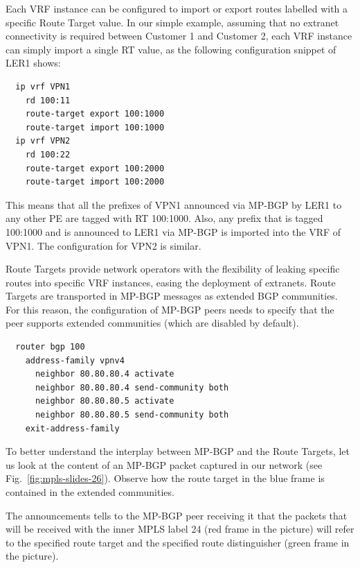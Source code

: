 \documentclass{article}
\newenvironment{codice}
{
\noindent
\begin{minipage}[b]{\columnwidth}
\definecolor{shadecolor}{rgb}{1,1,1}
\begin{framed}}
{
\vspace{-0.4cm}
\end{framed}
\end{minipage}
\definecolor{shadecolor}{rgb}{1,1,0.7}
}
\begin{document}
\begin{shaded}
\noindent
Each VRF instance can be configured to import or export routes labelled with a 
specific Route Target value. In our simple example, assuming that no extranet 
connectivity is required between Customer 1 and Customer 2, each VRF instance 
can simply import a single RT value, as the following configuration snippet of 
LER1 shows:

\begin{codice}
\begin{verbatim}
  ip vrf VPN1
    rd 100:11
    route-target export 100:1000
    route-target import 100:1000
  ip vrf VPN2
    rd 100:22
    route-target export 100:2000
    route-target import 100:2000
\end{verbatim}
\end{codice}

This means that all the prefixes of VPN1 announced via MP-BGP by LER1 to any other PE
are tagged with RT 100:1000. Also, any prefix that is tagged 100:1000 and is announced to
LER1 via MP-BGP is imported into the VRF of VPN1. The configuration for VPN2 is similar.
\end{shaded}

\begin{shaded}
\noindent
Route Targets provide network operators with the flexibility of leaking specific 
routes into specific VRF instances, easing the deployment of extranets. Route 
Targets are transported in MP-BGP messages as extended BGP communities. For 
this reason, the configuration of MP-BGP peers needs to specify that the peer 
supports extended communities (which are disabled by default).

\begin{codice}
\begin{verbatim}
  router bgp 100
    address-family vpnv4
      neighbor 80.80.80.4 activate
      neighbor 80.80.80.4 send-community both
      neighbor 80.80.80.5 activate
      neighbor 80.80.80.5 send-community both
    exit-address-family
\end{verbatim}
\end{codice}
\end{shaded}

\begin{shaded}
\noindent
To better understand the interplay between MP-BGP and the Route Targets, let us look 
at the content of an MP-BGP packet captured in our network (see
Fig.~\ref{fig:mpls-slides-26}). Observe how the route target in the blue frame is
contained in the extended communities. 

The announcements tells to the MP-BGP peer receiving it that the packets that will be
received with the inner MPLS label 24 (red frame in the picture) will refer to the
specified route target and the specified route distinguisher (green frame in the picture).
\end{shaded}
\end{document}
